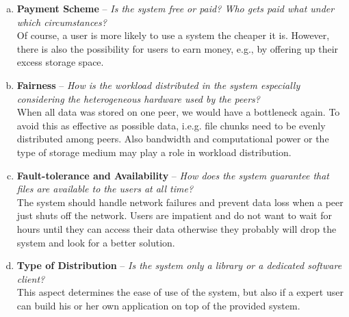 \begin{enumerate}[(a)]
\item \textbf{Payment Scheme} -- \textit{Is the system free or paid? Who gets paid what under which circumstances?}\\
Of course, a user is more likely to use a system the cheaper it is. However, there is also the possibility for users to earn money, e.g., by offering up their excess storage space.

\item \textbf{Fairness} -- \textit{How is the workload distributed in the system especially considering the heterogeneous hardware used by the peers?}\\
When all data was stored on one peer, we would have a bottleneck again. To avoid this as effective as possible data, i.e.g. file chunks need to be evenly distributed among peers. Also bandwidth and computational power or the type of storage medium may play a role in workload distribution.

\item \textbf{Fault-tolerance and Availability} -- \textit{How does the system guarantee that files are available to the users at all time?}\\
The system should handle network failures and prevent data loss when a peer just shuts off the network. Users are impatient and do not want to wait for hours until they can access their data otherwise they probably will drop the system and look for a better solution.

\item \textbf{Type of Distribution} -- \textit{Is the system only a library or a dedicated software client?}\\
This aspect determines the ease of use of the system, but also if a expert user can build his or her own application on top of the provided system.


\end{enumerate}
